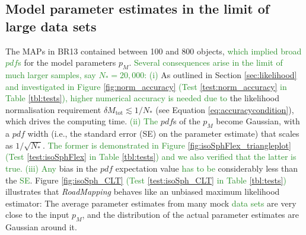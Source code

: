 \documentclass[iop,revtex4]{emulateapj}
\newcommand{\pdf}{\ensuremath{pdf}}
\newcommand{\pmodel}{\ensuremath{p_M}}
\newcommand{\MAP}{MAP}
\newcommand{\RM}{{\sl RoadMapping}}
\newcommand{\NEW}[1]{\textcolor{ForestGreen}{#1}}
\newcommand{\OLD}[1]{}
\begin{document}
\subsection{Model parameter estimates in the limit of large data sets} \label{sec:largedata}

The \OLD{individual }\MAP{}s in BR13 contained \OLD{typically }between 100 and 800 objects, \OLD{so that each \MAP{} implied  a quite broad \pdf{}}\NEW{which implied broad \pdf{}s} for the model parameters $\pmodel{}$. \OLD{Here we explore what happens in the limit of much larger samples, say $N_{*} = 20,000$ objects.}\NEW{Several consequences arise in the limit of much larger samples, say $N_{*} = 20,000$:} \NEW{(i)} As outlined in Section \ref{sec:likelihood} \NEW{and investigated in Figure \ref{fig:norm_accuracy} (Test \ref{test:norm_accuracy} in Table \ref{tbl:tests}),}\OLD{, the immediate consequence of larger samples is given by} \NEW{higher numerical accuracy is needed due to} the likelihood normalisation requirement $\delta M_\text{tot} \lesssim 1/N_{*}$ (see Equation \eqref{eq:accuracycondition}), which \OLD{is the modelling aspect that} drives the computing time. \NEW{(ii) The} \OLD{This issue aside, we would expect that in the limit of large data sets with vanishing measurement uncertainties the} \pdf{}s of the \pmodel{} become Gaussian, with a \pdf{} width (i.e., the standard error (SE) on the parameter estimate) that scales as $1/\sqrt{N_{*}}$. \NEW{The former is demonstrated in Figure \ref{fig:isoSphFlex_triangleplot} (Test \ref{test:isoSphFlex} in Table \ref{tbl:tests}) and we also verified that the latter is true.} \NEW{(iii) Any}\OLD{Further, we must verify that any} bias in the \pdf{} expectation value \OLD{is}\NEW{has to be} considerably less than the \NEW{SE}\OLD{error, even for quite large samples}. \OLD{Using sets of mock data, created according to the procedure in Section \ref{sec:mockdata} and a fiducial model for \pmodel{} (see Table \ref{tbl:tests}, Tests \ref{test:sqrtNiso}, \ref{test:isoSph_CLT}, and \ref{test:isoSphFlex}), we verified that \RM{} satisfies all these conditions and expectations: Figure \ref{fig:isoSphFlex_triangleplot} illustrates the joint \pdf{}s of all \pmodel{}. The \pdf{} is a multivariate Gaussian that projects into Gaussians when considering the marginalized \pdf{} for all the individual \pmodel{}. Figure \ref{fig:sqrtNiso} then demonstrates that the \pdf{} width indeed scales as $1/\sqrt{N_{*}}$.} Figure \ref{fig:isoSph_CLT} \NEW{(Test \ref{test:isoSph_CLT} in Table \ref{tbl:tests})} illustrates \OLD{even more }that \RM{} behaves like an unbiased maximum likelihood estimator: The average parameter estimates from many mock \OLD{samples with identical underlying \pmodel{}}\NEW{data sets} are very close to the input \pmodel{}, and the distribution of the actual parameter estimates are Gaussian around it.
\end{document}

